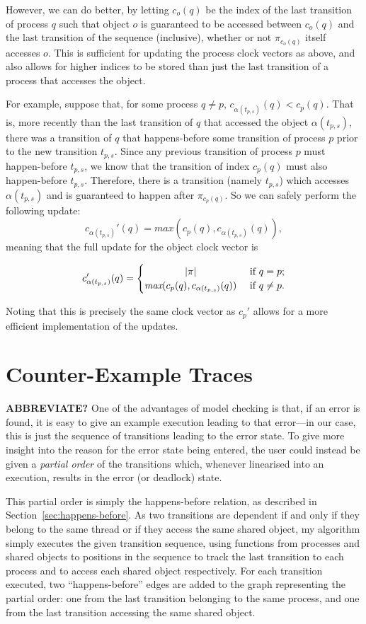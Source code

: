 \documentclass[12pt,a4paper,twoside,openright]{report}
\begin{document}
However, we can do better, by letting
$c_o(q)$ be the index of the
last transition of process
$q$ such that object $o$ is guaranteed to be
accessed between $c_o(q)$ and the last
transition of the sequence (inclusive),
whether or not $\pi_{c_o(q)}$ itself
accesses $o$.
This is sufficient for updating the
process clock vectors as above, and
also allows for higher indices to
be stored than just the last
transition of a process that
accesses the object.

For example, suppose that,
for some process $q \neq p$,
$c_{\alpha(t_{p,s})}(q) < c_p(q)$. That is,
more recently than the last transition of
$q$ that accessed the object $\alpha(t_{p,s})$,
there was a transition of $q$ that happens-before
some transition of process $p$ prior to the new
transition $t_{p,s}$. Since any previous
transition of process $p$ must happen-before
$t_{p,s}$, we know that the transition
of index $c_p(q)$ must also happen-before
$t_{p,s}$. Therefore, there is a transition
(namely $t_{p,s}$) which
accesses $\alpha(t_{p,s})$ and is guaranteed
to happen after $\pi_{c_p(q)}$. So we can
safely perform the following update:
\[ c_{\alpha(t_{p,s})}'(q) =\textit{max}(c_p(q),
c_{\alpha(t_{p,s})}(q)),
\]
meaning that the full update for the object
clock vector is

\[ c_{\alpha(t_{p,s})}'(q) =
\begin{cases}
\hfill |\pi| \hfill & \text{ if } q = p; \\
\hfill \textit{max}(c_p(q),
c_{\alpha(t_{p,s})}(q))
\hfill & \text{ if } q \neq p.
\end{cases}\]

Noting that this is precisely the same
clock vector as $c_p'$ allows for a
more efficient implementation of
the updates.

\section{Counter-Example Traces} \label{sec:traces}
\textbf{ABBREVIATE?}
One of the advantages of model checking
is that, if
an error is found, it is easy to
give an example execution leading
to that error---in
our case, this is just the sequence of
transitions leading to the error state.
To give more insight into the reason for the
error state being entered, the user could
instead be given a
\emph{partial order} of the transitions which,
whenever linearised into an execution,
results in the error (or deadlock) state.

This partial order is simply the happens-before
relation, as described in
Section~\ref{sec:happens-before}. As
two transitions are dependent if and only
if they belong to the same thread or if
they access the same shared object, my
algorithm simply executes the given transition
sequence, using functions from processes
and shared objects to positions in
the sequence to track the last
transition to each process and
to access each shared object respectively.
For each
transition executed, two ``happens-before''
edges are added
to the graph representing the partial
order: one from the last transition
belonging to the same process, and one
from the last transition accessing the
same shared object.
\end{document}
